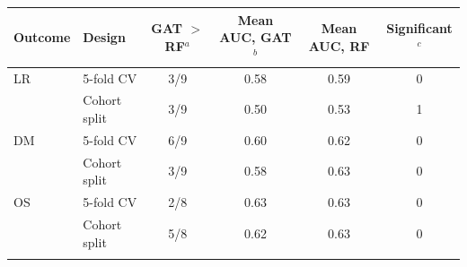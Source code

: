 \begin{tabular}{@{}llcccc@{}}
\toprule
Outcome & Design & GAT $>$ RF$^{a}$ & Mean AUC, GAT$^{b}$ & Mean AUC, RF & Significant$^{c}$ \\
\midrule
LR & 5-fold CV & 3/9 & 0.58 & 0.59 & 0 \\
 & Cohort split & 3/9 & 0.50 & 0.53 & 1 \\
\midrule
DM & 5-fold CV & 6/9 & 0.60 & 0.62 & 0 \\
 & Cohort split & 3/9 & 0.58 & 0.63 & 0 \\
\midrule
OS & 5-fold CV & 2/8 & 0.63 & 0.63 & 0 \\
 & Cohort split & 5/8 & 0.62 & 0.63 & 0 \\
\botrule
\end{tabular}

